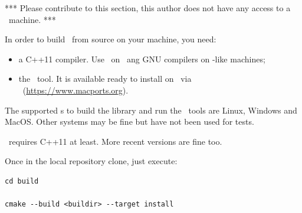 *** Please contribute to this section, this author does not have any access to a \Windows\ machine. ***

In order to build \mf\ from source on your machine, you need:
\begin{itemize}
\item a C++11 compiler. Use \xcode\ on \MacOS\ ang GNU compilers on \Unix -like machines;
\item the \cmake\ tool. It is available ready to install on \MacOS\ via \macports\ (\url{https://www.macports.org}).
\end{itemize}

The supported \OS s to build the library and run the \CLI\ tools are Linux, Windows and MacOS. Other systems may be fine but have not been used for tests.

\mf\ requires C++11 at least. More recent versions are fine too.

Once in the local repository clone, just execute:
\begin{lstlisting}[language=Terminal]
cd build

cmake --build <buildir> --target install
\end{lstlisting}

